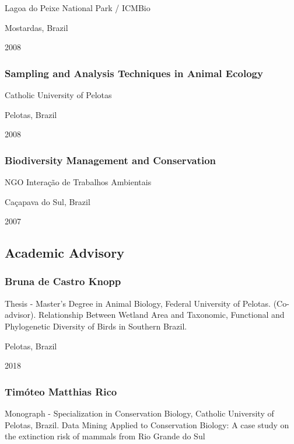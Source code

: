 \documentclass[
]{article}
\begin{document}
Lagoa do Peixe National Park / ICMBio

Mostardas, Brazil

2008

\hypertarget{sampling-and-analysis-techniques-in-animal-ecology}{%
\subsubsection{Sampling and Analysis Techniques in Animal
Ecology}\label{sampling-and-analysis-techniques-in-animal-ecology}}

Catholic University of Pelotas

Pelotas, Brazil

2008

\hypertarget{biodiversity-management-and-conservation}{%
\subsubsection{Biodiversity Management and
Conservation}\label{biodiversity-management-and-conservation}}

NGO Interação de Trabalhos Ambientais

Caçapava do Sul, Brazil

2007

\hypertarget{academic-advisory}{%
\subsection{Academic Advisory}\label{academic-advisory}}

\hypertarget{bruna-de-castro-knopp}{%
\subsubsection{Bruna de Castro Knopp}\label{bruna-de-castro-knopp}}

Thesis - Master's Degree in Animal Biology, Federal University of
Pelotas. (Co-advisor). Relationship Between Wetland Area and Taxonomic,
Functional and Phylogenetic Diversity of Birds in Southern Brazil.

Pelotas, Brazil

2018

\hypertarget{timuxf3teo-matthias-rico}{%
\subsubsection{Timóteo Matthias Rico}\label{timuxf3teo-matthias-rico}}

Monograph - Specialization in Conservation Biology, Catholic University
of Pelotas, Brazil. Data Mining Applied to Conservation Biology: A case
study on the extinction risk of mammals from Rio Grande do Sul
\end{document}

